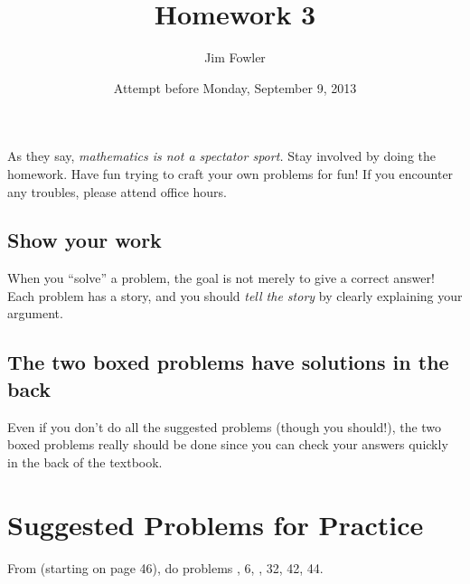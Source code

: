 \documentclass[12pt]{handout}
\title{Homework 3}
\date{Attempt before Monday, September  9, 2013}
\author{Jim Fowler}
\begin{document}
\maketitle



As they say, \textit{mathematics is not a spectator sport.}  Stay involved by doing the homework.  Have fun trying to craft your own problems for fun!  If you encounter any troubles, please attend office hours.





\subsection*{Show your work}
When you ``solve'' a problem, the goal is not merely to give a correct answer!  Each problem has a story, and you should \textit{tell the story} by clearly explaining your argument.


\subsection*{The two boxed problems have solutions in the back}
Even if you don't do all the suggested problems (though you should!), the two boxed problems really should be done since you can check your answers quickly in the back of the textbook.

\section*{Suggested Problems for Practice}

From  (starting on page 46),
do problems , 6, , 32, 42, 44.
\vspace{1ex}
\end{document}
